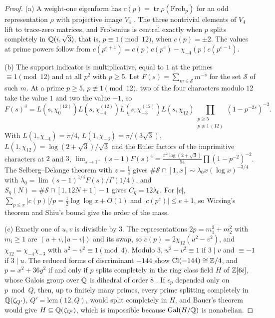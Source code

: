 \documentclass[11pt]{article}
\DeclareMathOperator{\Cl}{Cl}
\DeclareMathOperator{\tr}{tr}
\newcommand{\cnt}{\#}
\begin{document}
\begin{proof}
(a) A weight-one eigenform has $c(p)=\tr\rho(\mathrm{Frob}_p)$ for an odd representation
$\rho$ with projective image $V_4$ \cite{DeligneSerre1974}. The three nontrivial elements of
$V_4$ lift to trace-zero matrices, and Frobenius is central exactly when $p$ splits
completely in $\mathbb Q(i,\sqrt3)$, that is, $p\equiv1\pmod{12}$, when $c(p)=\pm2$. The values at
prime powers follow from $c(p^{e+1})=c(p)c(p^e)-\chi_{-4}(p)c(p^{e-1})$.

(b) The support indicator is multiplicative, equal to $1$ at the primes $\equiv1\pmod{12}$
and at all $p^2$ with $p\ge5$. Let $F(s)=\sum_{m\in\mathcal S}m^{-s}$ for the set
$\mathcal S$ of such $m$. At a prime $p\ge5$, $p\not\equiv1\pmod{12}$, two of the four
characters modulo $12$ take the value $1$ and two the value $-1$, so
\[
F(s)^4=L(s,\chi_0^{(12)})L(s,\chi_{-4}^{(12)})L(s,\chi_{-3}^{(12)})L(s,\chi_{12})
\prod_{\substack{p\ge5\\p\not\equiv1\,(12)}}(1-p^{-2s})^{-2}.
\]
With $L(1,\chi_{-4})=\pi/4$, $L(1,\chi_{-3})=\pi/(3\sqrt3)$, $L(1,\chi_{12})=\log(2+\sqrt3)/\sqrt3$
and the Euler factors of the imprimitive characters at $2$ and $3$,
$\lim_{s\to1^+}(s-1)F(s)^4=\frac{\pi^2\log(2+\sqrt3)}{54}\prod(1-p^{-2})^{-2}$. The
Selberg--Delange theorem \cite[II.5]{Tenenbaum} with $z=\frac14$ gives
$\cnt\mathcal S\cap[1,x]\sim\lambda_0x(\log x)^{-3/4}$ with
$\lambda_0=\lim(s-1)^{1/4}F(s)/\Gamma(1/4)$, and $S_\eta(N)=\cnt\mathcal S\cap[1,12N+1]-1$
gives $C_\eta=12\lambda_0$. For $|c|$, $\sum_{p\le x}|c(p)|/p=\frac12\log\log x+O(1)$ and
$|c(p^e)|\le e+1$, so Wirsing's theorem \cite{Wirsing1961} and Shiu's bound \cite{Shiu1980}
give the order of the mass.

(c) Exactly one of $u,v$ is divisible by $3$. The representations $2p=m_1^2+m_2^2$ with
$m_i\ge1$ are $(u+v,|u-v|)$ and its swap, so $c(p)=2\chi_{12}(u^2-v^2)$, and
$\chi_{12}=\chi_{-4}\chi_{-3}$ with $u^2-v^2\equiv1\pmod4$. Modulo $3$, $u^2-v^2\equiv1$ if
$3\mid v$ and $\equiv-1$ if $3\mid u$. The reduced forms of discriminant $-144$ show
$\Cl(-144)\cong\Z/4$, and $p=x^2+36y^2$ if and only if $p$ splits completely in the ring
class field $H$ of $\mathbb Z[6i]$, whose Galois group over $\mathbb Q$ is dihedral of order $8$
\cite[Thm.~9.4, Lemma~9.3]{Cox}. If $\epsilon_p$ depended only on $p\bmod Q$, then, up to
finitely many primes, every prime splitting completely in $\mathbb Q(\zeta_{Q'})$,
$Q'=\mathrm{lcm}(12,Q)$, would split completely in $H$, and Bauer's theorem
\cite[VII.13.9]{Neukirch} would give $H\subseteq\mathbb Q(\zeta_{Q'})$, which is impossible because
$\mathrm{Gal}(H/\mathbb Q)$ is nonabelian.
\end{proof}
\end{document}
